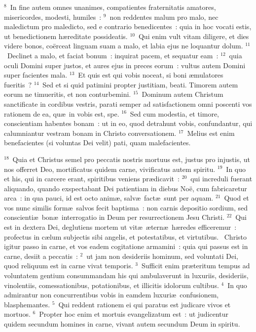 ${}^{8}$~In fine autem omnes unanimes, compatientes fraternitatis amatores, misericordes, modesti, humiles~:
${}^{9}$~non reddentes malum pro malo, nec maledictum pro maledicto, sed e contrario benedicentes~: quia in hoc vocati estis, ut benedictionem h\ae reditate possideatis.
${}^{10}$~Qui enim vult vitam diligere, et dies videre bonos, co\"erceat linguam suam a malo, et labia ejus ne loquantur dolum.
${}^{11}$~Declinet a malo, et faciat bonum~: inquirat pacem, et sequatur eam~:
${}^{12}$~quia oculi Domini super justos, et aures ejus in preces eorum~: vultus autem Domini super facientes mala.
${}^{13}$~Et quis est qui vobis noceat, si boni \ae mulatores fueritis~?
${}^{14}$~Sed et si quid patimini propter justitiam, beati. Timorem autem eorum ne timueritis, et non conturbemini.
${}^{15}$~Dominum autem Christum sanctificate in cordibus vestris, parati semper ad satisfactionem omni poscenti vos rationem de ea, qu\ae\ in vobis est, spe.
${}^{16}$~Sed cum modestia, et timore, conscientiam habentes bonam~: ut in eo, quod detrahunt vobis, confundantur, qui calumniantur vestram bonam in Christo conversationem.
${}^{17}$~Melius est enim benefacientes (si voluntas Dei velit) pati, quam malefacientes.


${}^{18}$~Quia et Christus semel pro peccatis nostris mortuus est, justus pro injustis, ut nos offerret Deo, mortificatus quidem carne, vivificatus autem spiritu.
${}^{19}$~In quo et his, qui in carcere erant, spiritibus veniens pr\ae dicavit~:
${}^{20}$~qui increduli fuerant aliquando, quando exspectabant Dei patientiam in diebus No\"e, cum fabricaretur arca~: in qua pauci, id est octo anim\ae , salv\ae\ fact\ae\ sunt per aquam.
${}^{21}$~Quod et vos nunc similis form\ae\ salvos fecit baptisma~: non carnis depositio sordium, sed conscienti\ae\ bon\ae\ interrogatio in Deum per resurrectionem Jesu Christi.
${}^{22}$~Qui est in dextera Dei, deglutiens mortem ut vit\ae\ \ae tern\ae\ h\ae redes efficeremur~: profectus in c\ae lum subjectis sibi angelis, et potestatibus, et virtutibus.
~Christo igitur passo in carne, et vos eadem cogitatione armamini~: quia qui passus est in carne, desiit a peccatis~:
${}^{2}$~ut jam non desideriis hominum, sed voluntati Dei, quod reliquum est in carne vivat temporis.
${}^{3}$~Sufficit enim pr\ae teritum tempus ad voluntatem gentium consummandam his qui ambulaverunt in luxuriis, desideriis, vinolentiis, comessationibus, potationibus, et illicitis idolorum cultibus.
${}^{4}$~In quo admirantur non concurrentibus vobis in eamdem luxuri\ae\ confusionem, blasphemantes.
${}^{5}$~Qui reddent rationem ei qui paratus est judicare vivos et mortuos.
${}^{6}$~Propter hoc enim et mortuis evangelizatum est~: ut judicentur quidem secundum homines in carne, vivant autem secundum Deum in spiritu.


